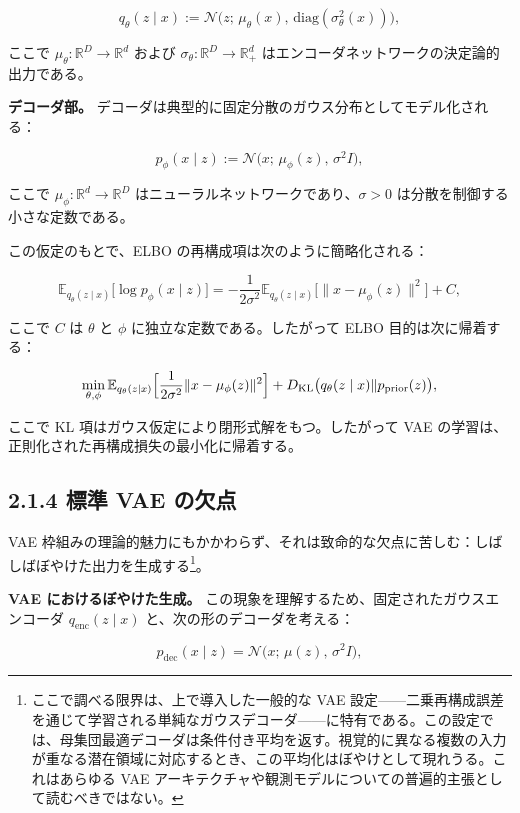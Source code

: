 \[
q_\theta(z\mid x) := \mathcal{N}\bigl(z;\, \mu_\theta(x),\, \mathrm{diag}(\sigma_\theta^2(x))\bigr),
\]


ここで $\mu_\theta : \mathbb{R}^D \to \mathbb{R}^d$ および $\sigma_\theta : \mathbb{R}^D \to \mathbb{R}_+^d$ はエンコーダネットワークの決定論的出力である。

\textbf{デコーダ部。} デコーダは典型的に固定分散のガウス分布としてモデル化される：

\[
p_\phi(x\mid z) := \mathcal{N}\bigl(x;\, \mu_\phi(z),\, \sigma^2 I\bigr),
\]


ここで $\mu_\phi : \mathbb{R}^d \to \mathbb{R}^D$ はニューラルネットワークであり、$\sigma > 0$ は分散を制御する小さな定数である。

この仮定のもとで、ELBO の再構成項は次のように簡略化される：

\[
\mathbb{E}_{q_\theta(z\mid x)}\bigl[\log p_\phi(x\mid z)\bigr]
= -\frac{1}{2\sigma^2}\mathbb{E}_{q_\theta(z\mid x)}\bigl[\|x - \mu_\phi(z)\|^2\bigr] + C,
\]


ここで $C$ は $\theta$ と $\phi$ に独立な定数である。したがって ELBO 目的は次に帰着する：

\[
\min_{\theta,\phi}
\mathbb{E}_{q_\theta(z\mid x)}\Bigl[\frac{1}{2\sigma^2}\|x - \mu_\phi(z)\|^2\Bigr]
+ D_{\mathrm{KL}}\bigl(q_\theta(z\mid x)\Vert p_{\mathrm{prior}}(z)\bigr),
\]


ここで KL 項はガウス仮定により閉形式解をもつ。したがって VAE の学習は、正則化された再構成損失の最小化に帰着する。

\subsection*{2.1.4 標準 VAE の欠点}


VAE 枠組みの理論的魅力にもかかわらず、それは致命的な欠点に苦しむ：しばしばぼやけた出力を生成する\footnote{ここで調べる限界は、上で導入した一般的な VAE 設定——二乗再構成誤差を通じて学習される単純なガウスデコーダ——に特有である。この設定では、母集団最適デコーダは条件付き平均を返す。視覚的に異なる複数の入力が重なる潜在領域に対応するとき、この平均化はぼやけとして現れうる。これはあらゆる VAE アーキテクチャや観測モデルについての普遍的主張として読むべきではない。}。

\textbf{VAE におけるぼやけた生成。} この現象を理解するため、固定されたガウスエンコーダ $q_{\mathrm{enc}}(z\mid x)$ と、次の形のデコーダを考える：

\[
p_{\mathrm{dec}}(x\mid z) = \mathcal{N}\bigl(x;\, \mu(z),\, \sigma^2 I\bigr),
\]


